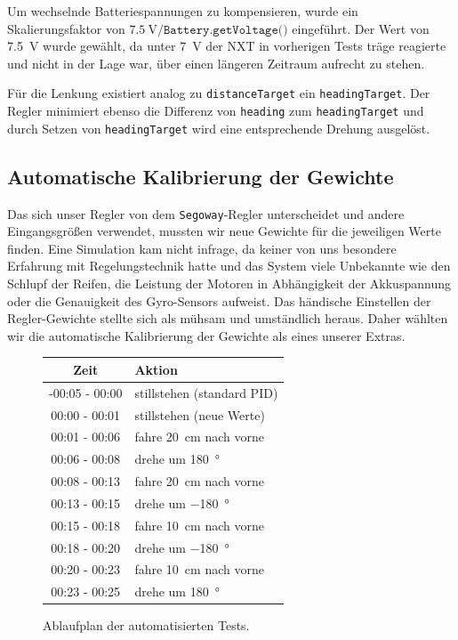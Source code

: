 \documentclass[oneside,abstractoff,a4paper]{scrartcl}
\begin{document}
\begin{sloppypar}
Um wechselnde Batteriespannungen zu kompensieren, wurde ein Skalierungsfaktor von $\SI{7.5}{\volt}/\texttt{Battery.getVoltage()}$ eingeführt. Der Wert von \SI{7.5}{\volt} wurde gewählt, da unter \SI{7}{\volt} der NXT in vorherigen Tests träge reagierte und nicht in der Lage war, über einen längeren Zeitraum aufrecht zu stehen. 

Für die Lenkung existiert analog zu \texttt{distanceTarget} ein \texttt{headingTarget}. Der Regler minimiert ebenso die Differenz von \texttt{heading} zum \texttt{headingTarget} und durch Setzen von \texttt{headingTarget} wird eine entsprechende Drehung ausgelöst.
\end{sloppypar}
\subsection{Automatische Kalibrierung der Gewichte}
\label{subsec:autoPID}

Das sich unser Regler von dem \texttt{Segoway}-Regler unterscheidet und andere Eingangsgrößen verwendet, mussten wir neue Gewichte für die jeweiligen Werte finden. Eine Simulation kam nicht infrage, da keiner von uns besondere Erfahrung mit Regelungstechnik hatte und das System viele Unbekannte wie den Schlupf der Reifen, die Leistung der Motoren in Abhängigkeit der Akkuspannung oder die Genauigkeit des Gyro-Sensors aufweist. Das händische Einstellen der Regler-Gewichte stellte sich als mühsam und umständlich heraus. Daher wählten wir die automatische Kalibrierung der Gewichte als eines unserer Extras.
\begin{figure}
  \begin{tabular}{|c|l|}\hline
    \textbf{Zeit} & \textbf{Aktion}\\\hline
    -00:05 - 00:00 & stillstehen (standard PID)\\
    00:00 - 00:01 & stillstehen (neue Werte)\\
    00:01 - 00:06 & fahre \SI{20}{\centi\meter} nach vorne\\
    00:06 - 00:08 & drehe um \SI{180}{\degree}\\
    00:08 - 00:13 & fahre \SI{20}{\centi\meter} nach vorne\\
    00:13 - 00:15 & drehe um \SI{-180}{\degree}\\
    00:15 - 00:18 & fahre \SI{10}{\centi\meter} nach vorne\\
    00:18 - 00:20 & drehe um \SI{-180}{\degree}\\
    00:20 - 00:23 & fahre \SI{10}{\centi\meter} nach vorne\\
    00:23 - 00:25 & drehe um \SI{180}{\degree}\\\hline
  \end{tabular}
  \caption{Ablaufplan der automatisierten Tests.}
  \label{fig:evo_test}
\end{figure}
\end{document}
